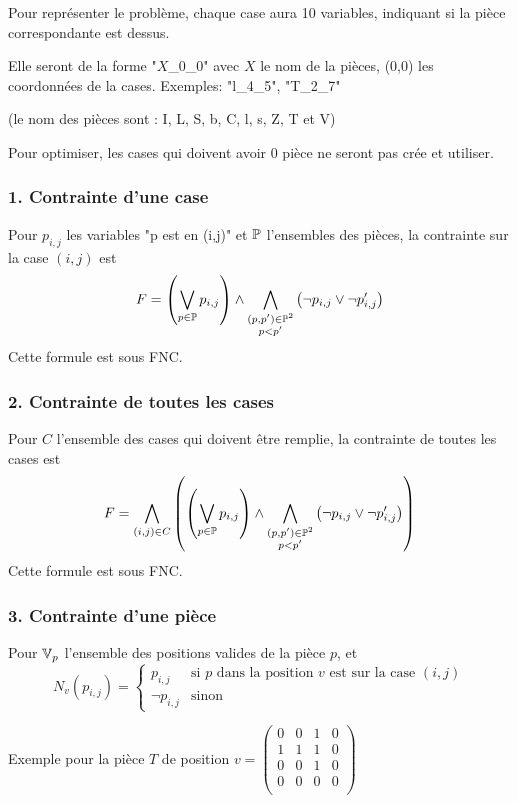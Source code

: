     Pour représenter le problème, chaque case aura 10 variables,
    indiquant si la pièce correspondante est dessus.
    
    Elle seront de la forme "$X$\_0\_0" avec $X$ le nom de la pièces,
    (0,0) les coordonnées de la cases.
    Exemples: "l\_4\_5", "T\_2\_7"
    
    (le nom des pièces sont : I, L, S, b, C, l, s, Z, T et V)
    
    Pour optimiser, les cases qui doivent avoir 0 pièce ne seront pas crée et utiliser.
    
    \subsubsection*{1. Contrainte d'une case}
    Pour $p_{i,j}$ les variables "p est en (i,j)" et $\mathbb{P}$ l'ensembles des pièces,
    la contrainte sur la case $(i,j)$ est
    \[F = \left(\bigvee_{p\in\mathbb{P}} p_{i,j} \right) \land
        \bigwedge_{\substack{(p,p')\in\mathbb{P}^2\\p<p'}}\left(\lnot p_{i,j} \lor \lnot p'_{i,j}\right)\]
    Cette formule est sous FNC.
    
    \subsubsection*{2. Contrainte de toutes les cases}
    Pour $C$ l'ensemble des cases qui doivent être remplie,
    la contrainte de toutes les cases est
    \[F = \bigwedge_{(i,j)\in C} \left(\left(\bigvee_{p\in\mathbb{P}} p_{i,j} \right) \land
        \bigwedge_{\substack{(p,p')\in\mathbb{P}^2\\p<p'}}\left(\lnot p_{i,j} \lor \lnot p'_{i,j}\right)\right)\]
    Cette formule est sous FNC.
    
    \subsubsection*{3. Contrainte d'une pièce}
    Pour $\mathbb{V}_p$ l'ensemble des positions valides de la pièce $p$,
    et
    \[N_v(p_{i,j}) = \begin{cases}
        p_{i,j} & \text{si $p$ dans la position $v$ est sur la case $(i,j)$}\\
        \lnot p_{i,j} & \text{sinon}
    \end{cases}\]
    
    Exemple pour la pièce $T$ de position $v =
    \begin{pmatrix}
        0 & 0 & 1 & 0 \\
        1 & 1 & 1 & 0 \\
        0 & 0 & 1 & 0 \\
        0 & 0 & 0 & 0 \\
    \end{pmatrix}$
    
